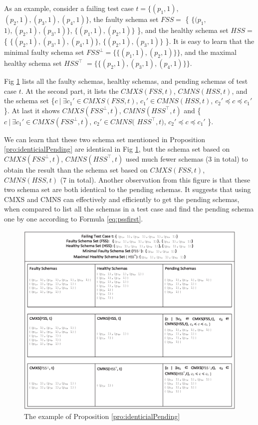 {As an example, consider a failing test case $t = \{(p_{1}, 1),$ $ (p_{2}, 1), (p_{3}, 1), (p_{4}, 1)\}$, the faulty schema set $FSS =$ \{ $\{(p_{1}, $ $1), (p_{2}, 1), (p_{3}, 1)\}$, $\{(p_{1}, 1), (p_{2}, 1)\}$ \}, and the healthy schema set $HSS =$  \{ $\{(p_{2}, 1), (p_{3}, 1), (p_{4}, 1)\}$, $\{(p_{2}, 1), (p_{3}, 1)\}$ \}. It is easy to learn that the minimal faulty schema set $FSS^{\bot} = \{\{(p_{1}, 1), (p_{2}, 1)\}\}$, and the maximal healthy schema set $HSS^{\top}$ $= \{\{ (p_{2}, 1), (p_{3}, 1), (p_{4}, 1) \}\}$.

Fig \ref{fig_minmax} lists all the faulty schemas, healthy schemas, and pending schemas of test case $t$. At the second part, it lists the $CMXS(FSS, t)$, $CMNS(HSS, t)$, and the schema set \{$ c\ |\ \exists c_{1}' \in CMXS(FSS, t)$, $c_{1}' \in CMNS(HSS, t)$, $c_{2}' \preceq c \preceq c_{1}'$ \}. At last it shows $CMXS(FSS^{\bot}, t)$, $CMNS(HSS^{\top}, t)$ and  \{$ c\ |\ \exists c_{1}' \in CMXS(FSS^{\bot}, t)$, $ c_{2}' \in CMNS($ $HSS^{\top}, t)$, $c_{2}' \preceq c \preceq c_{1}'$ \}.

We can learn that these two schema set mentioned in Proposition \ref{pro:identicialPending} are identical in Fig \ref{fig_minmax}, but the schema set based on $CMXS(FSS^{\bot}, t)$, $CMNS(HSS^{\top}, t)$ used much fewer schemas (3 in total) to obtain the result than the schema set based on $CMXS(FSS, t)$, $CMNS(HSS, t)$ (7 in total). Another observation from this figure is that these two schema set are both identical to the pending schemas. It suggests that using CMXS and CMNS can effectively and efficiently to get the pending schemas, when compared to list all the schemas in a test case and find the pending schema one by one according to Formula \ref{eq:pssfirst}.

\begin{figure}[ht]
 \centering
 \includegraphics[width=7in]{minmax.eps}
 \caption{The example of Proposition \ref{pro:identicialPending}}
 \label{fig_minmax}
\end{figure}


}
